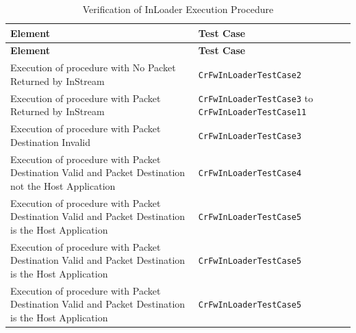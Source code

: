 \documentclass[a4paper,10pt]{article}
\begin{document}
\begin{longtable}{|>{\raggedright}p{6.0cm}|P{5.0cm}|}
\caption{Verification of InLoader Execution Procedure}
\label{tab:verInLoaderExecProc}\\
\hline
{}
\textbf{Element} & \textbf{Test Case} \\
\hline
\endfirsthead
{}
\textbf{Element} & \textbf{Test Case} \\
\hline
\endhead
Execution of procedure with No Packet Returned by InStream  & \texttt{CrFwInLoaderTestCase2}\\
\hline
Execution of procedure with Packet Returned by InStream  & \texttt{CrFwInLoaderTestCase3} to \texttt{CrFwInLoaderTestCase11}\\
\hline
Execution of procedure with Packet Destination Invalid  & \texttt{CrFwInLoaderTestCase3}\\
\hline
Execution of procedure with Packet Destination Valid and Packet Destination not the Host Application  & \texttt{CrFwInLoaderTestCase4}\\
\hline
Execution of procedure with Packet Destination Valid and Packet Destination is the Host Application  & \texttt{CrFwInLoaderTestCase5}\\
\hline
Execution of procedure with Packet Destination  Valid and Packet Destination is the Host Application  & \texttt{CrFwInLoaderTestCase5}\\
\hline
Execution of procedure with Packet Destination  Valid and Packet Destination is the Host Application  & \texttt{CrFwInLoaderTestCase5}\\
\hline
\end{longtable}
\end{document}

